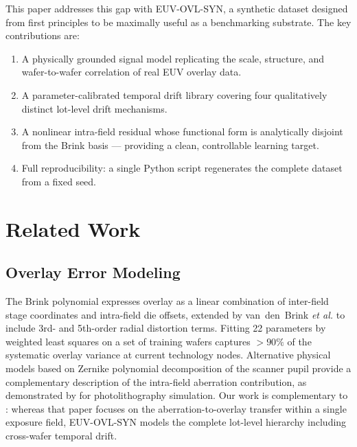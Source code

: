 \documentclass[10pt,conference]{IEEEtran}
\begin{document}
This paper addresses this gap with \textsc{EUV-OVL-SYN}, a synthetic dataset
designed from first principles to be maximally useful as a benchmarking
substrate.  The key contributions are:
\begin{enumerate}
  \item A physically grounded signal model replicating the scale, structure,
        and wafer-to-wafer correlation of real EUV overlay data.
  \item A parameter-calibrated temporal drift library covering four
        qualitatively distinct lot-level drift mechanisms.
  \item A nonlinear intra-field residual whose functional form is analytically
        disjoint from the Brink basis — providing a clean, controllable
        learning target.
  \item Full reproducibility: a single Python script regenerates the complete
        dataset from a fixed seed.
\end{enumerate}

\section{Related Work}

\subsection{Overlay Error Modeling}

The Brink polynomial \cite{brink1994} expresses overlay as a linear
combination of inter-field stage coordinates and intra-field die offsets,
extended by van~den~Brink \textit{et al.} \cite{vandenBrink1996} to include
3rd- and 5th-order radial distortion terms.  Fitting 22 parameters by
weighted least squares on a set of training wafers captures
$>90\%$ of the systematic overlay variance at current technology nodes.
Alternative physical models based on Zernike polynomial decomposition of the
scanner pupil \cite{bornwolf1999, erdmann2021} provide a complementary
description of the intra-field aberration contribution, as demonstrated by
\cite{magklaras2025} for photolithography simulation.  Our work is
complementary to \cite{magklaras2025}: whereas that paper focuses on the
aberration-to-overlay transfer within a single exposure field, EUV-OVL-SYN
models the complete lot-level hierarchy including cross-wafer temporal drift.
\end{document}
